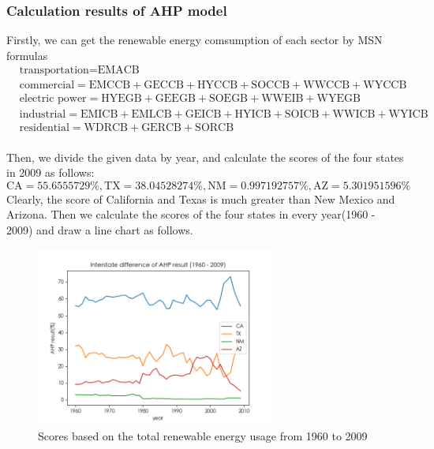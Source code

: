 \documentclass[a4paper,11pt]{article}
\begin{document}
\subsubsection{Calculation results of AHP model}
\par Firstly, we can get the renewable energy comsumption of each sector by MSN formulas \cite{4}
\begin{align*}
    & \text{transportation} = \text{EMACB} \\
    & \text{commercial} = \text{EMCCB} + \text{GECCB} + \text{HYCCB} + \text{SOCCB} + \text{WWCCB} + \text{WYCCB} \\
    & \text{electric power} = \text{HYEGB} + \text{GEEGB} + \text{SOEGB} + \text{WWEIB} + \text{WYEGB} \\
    & \text{industrial} = \text{EMICB} + \text{EMLCB} + \text{GEICB} + \text{HYICB} + \text{SOICB} + \text{WWICB} + \text{WYICB} \\
    & \text{residential} = \text{WDRCB} + \text{GERCB} + \text{SORCB} \\
\end{align*}

\par Then, we divide the given data by year, and calculate the scores of the four states in 2009 as follows:
\[
    \text{CA}=55.6555729\%, \text{TX}=38.04528274\%, \text{NM}=0.997192757\%, \text{AZ}=5.301951596\%
\]
Clearly, the score of California and Texas is much greater than New Mexico and Arizona.
Then we calculate the scores of the four states in every year(1960 - 2009) and draw a line chart as follows.
\begin{figure}[!hptb] 
    \centering 
    \includegraphics[width=0.7\textwidth]{./Pic/B-level-predict.png}
    \caption{Scores based on the total renewable energy usage from 1960 to 2009}
    \label{fig:B-level-predict}
\end{figure}
\end{document}
